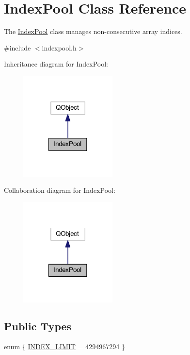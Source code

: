 \hypertarget{class_index_pool}{\section{Index\-Pool Class Reference}
\label{class_index_pool}
}


The \hyperlink{class_index_pool}{Index\-Pool} class manages non-\/consecutive array indices.  




{\ttfamily \#include $<$indexpool.\-h$>$}



Inheritance diagram for Index\-Pool\-:\nopagebreak
\begin{figure}[H]
\begin{center}
\leavevmode
\includegraphics[width=138pt]{class_index_pool__inherit__graph}
\end{center}
\end{figure}


Collaboration diagram for Index\-Pool\-:\nopagebreak
\begin{figure}[H]
\begin{center}
\leavevmode
\includegraphics[width=138pt]{class_index_pool__coll__graph}
\end{center}
\end{figure}
\subsection*{Public Types}
\begin{DoxyCompactItemize}
\item 
enum \{ \hyperlink{class_index_pool_abacc88fb0ea6d1dcad5be70710ed0e3da3a3d6446453050cd4c95439b37b6824a}{I\-N\-D\-E\-X\-\_\-\-L\-I\-M\-I\-T} = 4294967294
 \}
\end{DoxyCompactItemize}
